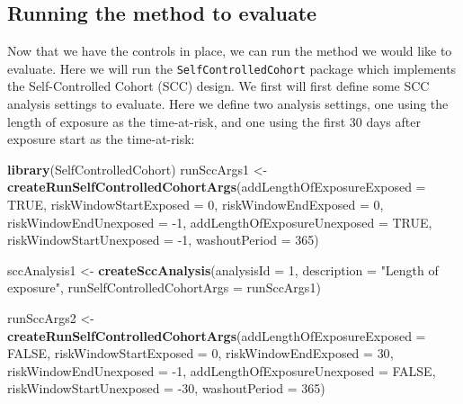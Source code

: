 \documentclass[]{article}
\newenvironment{Shaded}{\begin{snugshade}}{\end{snugshade}}
\newcommand{\DataTypeTok}[1]{\textcolor[rgb]{0.13,0.29,0.53}{#1}}
\newcommand{\DecValTok}[1]{\textcolor[rgb]{0.00,0.00,0.81}{#1}}
\newcommand{\KeywordTok}[1]{\textcolor[rgb]{0.13,0.29,0.53}{\textbf{#1}}}
\newcommand{\NormalTok}[1]{#1}
\newcommand{\OtherTok}[1]{\textcolor[rgb]{0.56,0.35,0.01}{#1}}
\newcommand{\StringTok}[1]{\textcolor[rgb]{0.31,0.60,0.02}{#1}}
\begin{document}
\hypertarget{running-the-method-to-evaluate}{%
\subsection{Running the method to
evaluate}\label{running-the-method-to-evaluate}}

Now that we have the controls in place, we can run the method we would
like to evaluate. Here we will run the \texttt{SelfControlledCohort}
package which implements the Self-Controlled Cohort (SCC) design. We
first will first define some SCC analysis settings to evaluate. Here we
define two analysis settings, one using the length of exposure as the
time-at-risk, and one using the first 30 days after exposure start as
the time-at-risk:

\begin{Shaded}
\begin{Highlighting}[]
\KeywordTok{library}\NormalTok{(SelfControlledCohort)}
\NormalTok{runSccArgs1 <-}\StringTok{ }\KeywordTok{createRunSelfControlledCohortArgs}\NormalTok{(}\DataTypeTok{addLengthOfExposureExposed =} \OtherTok{TRUE}\NormalTok{,}
                                                 \DataTypeTok{riskWindowStartExposed =} \DecValTok{0}\NormalTok{,}
                                                 \DataTypeTok{riskWindowEndExposed =} \DecValTok{0}\NormalTok{,}
                                                 \DataTypeTok{riskWindowEndUnexposed =} \DecValTok{-1}\NormalTok{,}
                                                 \DataTypeTok{addLengthOfExposureUnexposed =} \OtherTok{TRUE}\NormalTok{,}
                                                 \DataTypeTok{riskWindowStartUnexposed =} \DecValTok{-1}\NormalTok{,}
                                                 \DataTypeTok{washoutPeriod =} \DecValTok{365}\NormalTok{)}

\NormalTok{sccAnalysis1 <-}\StringTok{ }\KeywordTok{createSccAnalysis}\NormalTok{(}\DataTypeTok{analysisId =} \DecValTok{1}\NormalTok{,}
                                  \DataTypeTok{description =} \StringTok{"Length of exposure"}\NormalTok{,}
                                  \DataTypeTok{runSelfControlledCohortArgs =}\NormalTok{ runSccArgs1)}

\NormalTok{runSccArgs2 <-}\StringTok{ }\KeywordTok{createRunSelfControlledCohortArgs}\NormalTok{(}\DataTypeTok{addLengthOfExposureExposed =} \OtherTok{FALSE}\NormalTok{,}
                                                 \DataTypeTok{riskWindowStartExposed =} \DecValTok{0}\NormalTok{,}
                                                 \DataTypeTok{riskWindowEndExposed =} \DecValTok{30}\NormalTok{,}
                                                 \DataTypeTok{riskWindowEndUnexposed =} \DecValTok{-1}\NormalTok{,}
                                                 \DataTypeTok{addLengthOfExposureUnexposed =} \OtherTok{FALSE}\NormalTok{,}
                                                 \DataTypeTok{riskWindowStartUnexposed =} \DecValTok{-30}\NormalTok{,}
                                                 \DataTypeTok{washoutPeriod =} \DecValTok{365}\NormalTok{)}


\end{Highlighting}
\end{Shaded}
\end{document}
